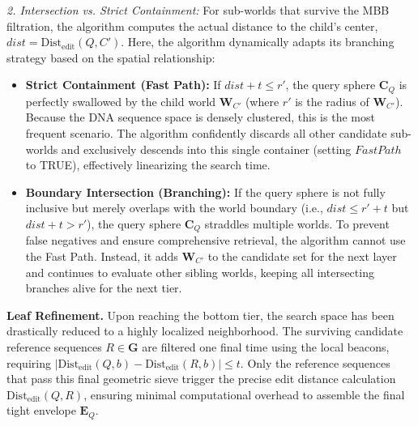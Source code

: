 \documentclass[10pt,runningheads]{llncs}
\begin{document}
\textit{2. Intersection vs. Strict Containment:} For sub-worlds that survive the MBB filtration, the algorithm computes the actual distance to the child's center, $dist = \mathrm{Dist}_{\mathrm{edit}}(Q, C')$. Here, the algorithm dynamically adapts its branching strategy based on the spatial relationship:
\begin{itemize}
    \item \textbf{Strict Containment (Fast Path):} If $dist + t \le r'$, the query sphere $\textbf{C}_Q$ is perfectly swallowed by the child world $\textbf{W}_{C'}$ (where $r'$ is the radius of $\textbf{W}_{C'}$). Because the DNA sequence space is densely clustered, this is the most frequent scenario. The algorithm confidently discards all other candidate sub-worlds and exclusively descends into this single container (setting $FastPath$ to TRUE), effectively linearizing the search time.
    \item \textbf{Boundary Intersection (Branching):} If the query sphere is not fully inclusive but merely overlaps with the world boundary (i.e., $dist \le r' + t$ but $dist + t > r'$), the query sphere $\textbf{C}_Q$ straddles multiple worlds. To prevent false negatives and ensure comprehensive retrieval, the algorithm cannot use the Fast Path. Instead, it adds $\textbf{W}_{C'}$ to the candidate set for the next layer and continues to evaluate other sibling worlds, keeping all intersecting branches alive for the next tier.
\end{itemize}

\textbf{Leaf Refinement.}
Upon reaching the bottom tier, the search space has been drastically reduced to a highly localized neighborhood. The surviving candidate reference sequences $R \in \textbf{G}$ are filtered one final time using the local beacons, requiring $|\mathrm{Dist}_{\mathrm{edit}}(Q, b) - \mathrm{Dist}_{\mathrm{edit}}(R, b)| \le t$. Only the reference sequences that pass this final geometric sieve trigger the precise edit distance calculation $\mathrm{Dist}_{\mathrm{edit}}(Q, R)$, ensuring minimal computational overhead to assemble the final tight envelope $\textbf{E}_Q$.
\end{document}
